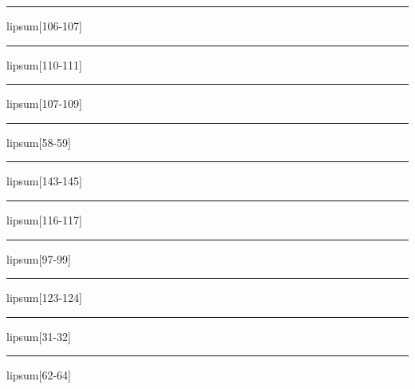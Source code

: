 \documentclass[11pt,a4paper]{article}
\begin{document}
\begin{simplewrap}
  \textcolor{brown!25}{\rule{3.9cm}{3.1cm}}
\end{simplewrap}
lipsum[106-107]

\begin{simplewrap}
  \textcolor{blue!45}{\rule{5.8cm}{9.0cm}}
\end{simplewrap}
lipsum[110-111]

\begin{simplewrap}
  \textcolor{blue!32}{\rule{5.8cm}{7.4cm}}
\end{simplewrap}
lipsum[107-109]

\begin{simplewrap}
  \textcolor{violet!34}{\rule{3.6cm}{6.3cm}}
\end{simplewrap}
lipsum[58-59]

\begin{simplewrap}
  \textcolor{purple!39}{\rule{5.7cm}{6.5cm}}
\end{simplewrap}
lipsum[143-145]

\begin{simplewrap}
  \textcolor{pink!25}{\rule{3.8cm}{4.6cm}}
\end{simplewrap}
lipsum[116-117]

\begin{simplewrap}
  \textcolor{green!44}{\rule{5.2cm}{3.5cm}}
\end{simplewrap}
lipsum[97-99]

\begin{simplewrap}
  \textcolor{blue!14}{\rule{3.6cm}{8.1cm}}
\end{simplewrap}
lipsum[123-124]

\begin{simplewrap}
  \textcolor{brown!29}{\rule{5.9cm}{2.1cm}}
\end{simplewrap}
lipsum[31-32]

\begin{simplewrap}
  \textcolor{red!25}{\rule{5.1cm}{7.6cm}}
\end{simplewrap}
lipsum[62-64]
\end{document}
